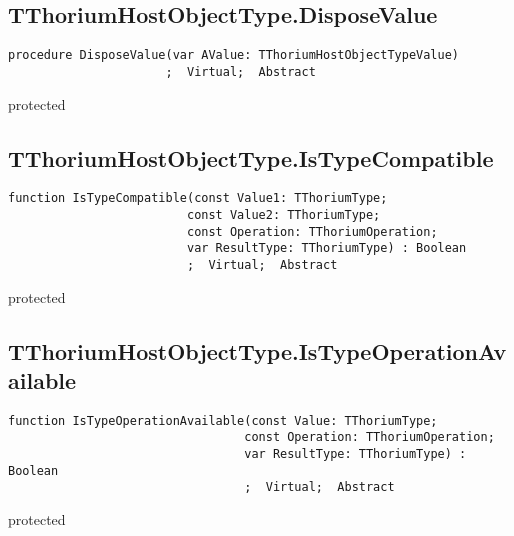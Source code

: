 \subsection{TThoriumHostObjectType.DisposeValue}
\label{thoriumcore:thorium:tthoriumhostobjecttype:disposevalue}
\begin{FPCList}
\Synopsis
\Declaration 

\begin{verbatim}
procedure DisposeValue(var AValue: TThoriumHostObjectTypeValue)
                      ;  Virtual;  Abstract
\end{verbatim}
\Visibility
protected
\Description
\Errors
\end{FPCList}
\subsection{TThoriumHostObjectType.IsTypeCompatible}
\label{thoriumcore:thorium:tthoriumhostobjecttype:istypecompatible}
\begin{FPCList}
\Synopsis
\Declaration 

\begin{verbatim}
function IsTypeCompatible(const Value1: TThoriumType;
                         const Value2: TThoriumType;
                         const Operation: TThoriumOperation;
                         var ResultType: TThoriumType) : Boolean
                         ;  Virtual;  Abstract
\end{verbatim}
\Visibility
protected
\Description
\Errors
\end{FPCList}
\subsection{TThoriumHostObjectType.IsTypeOperationAvailable}
\label{thoriumcore:thorium:tthoriumhostobjecttype:istypeoperationavailable}
\begin{FPCList}
\Synopsis
\Declaration 

\begin{verbatim}
function IsTypeOperationAvailable(const Value: TThoriumType;
                                 const Operation: TThoriumOperation;
                                 var ResultType: TThoriumType) : Boolean
                                 ;  Virtual;  Abstract
\end{verbatim}
\Visibility
protected
\Description
\Errors
\end{FPCList}
